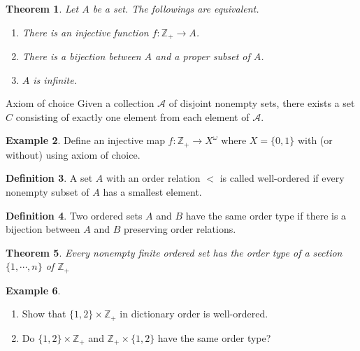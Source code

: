 \documentclass{beamer}
\theoremstyle{plain}
\newtheorem{thm}{Theorem}[section]
\theoremstyle{definition}
\newtheorem{defn}[thm]{Definition}
\newtheorem{exmp}[thm]{Example}
\begin{document}
\begin{frame}
\begin{thm}
	Let $A$ be a set.
	The followings are equivalent.
	\begin{enumerate}
		\item There is an injective function 
		$f:\mathbb Z_+\to A$.
		\item There is a bijection between $A$
		and a proper subset of $A$.
		\item $A$ is infinite.
	\end{enumerate}
\end{thm}
\begin{block}{Axiom of choice}
	Given a collection $\mathcal A$ of 
	disjoint nonempty sets, there exists a set
	$C$ consisting of exactly one element from
	each element of $\mathcal A$.
\end{block}
\begin{exmp}
	Define an injective map 
	$f:\mathbb Z_+\to X^\omega$ where $X=\{0,1\}$
	with (or without) using axiom of choice.
\end{exmp}
\end{frame}

\begin{frame}
\begin{defn}
	A set $A$ with an order relation $<$ is called
	well-ordered if every nonempty subset of $A$
	has a smallest element.		
\end{defn}
\begin{defn}
	Two ordered sets $A$ and $B$ have the same
	order type if there is a bijection between 
	$A$ and $B$ preserving order relations.
\end{defn}
\begin{thm}
	Every nonempty finite ordered set has 
	the order type of a section $\{1,\cdots,n\}$
	of $\mathbb Z_+$
\end{thm}
\begin{exmp}
	\begin{enumerate}
		\item Show that $\{1,2\}\times\mathbb Z_+$
		in dictionary order is well-ordered.
		\item Do $\{1,2\}\times\mathbb Z_+$ and
		$\mathbb Z_+\times\{1,2\}$ have the same 
		order type?
	\end{enumerate}
\end{exmp}
\end{frame}
\end{document}
